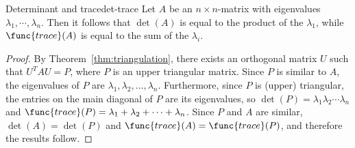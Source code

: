 \begin{corollary}{Determinant and trace}{det-trace}
Let $A$ be an $n \times n$-matrix with eigenvalues $\lambda_1, \cdots, \lambda_n$. Then it follows that $\det(A)$ is equal to the product of the $\lambda_1$, while $\func{trace}(A)$ is equal to the sum of the $\lambda_i$. 
\end{corollary}

\begin{proof}
By Theorem~\ref{thm:triangulation}, there exists an orthogonal matrix $U$ such
that $U^TAU=P$, where $P$ is an upper triangular matrix.
Since $P$ is similar to $A$, the eigenvalues
of $P$ are $\lambda_1, \lambda_2, \ldots, \lambda_n$.
Furthermore, since $P$ is (upper) triangular, the entries on the
main diagonal of $P$ are its eigenvalues, so
$\det(P)=\lambda_1 \lambda_2 \cdots \lambda_n$ and
$\func{trace}(P)=\lambda_1 + \lambda_2 + \cdots + \lambda_n$.
Since $P$ and $A$ are similar, $\det(A)=\det(P)$ and $\func{trace}(A)=\func{trace}(P)$,
and therefore the results follow.
\end{proof}
